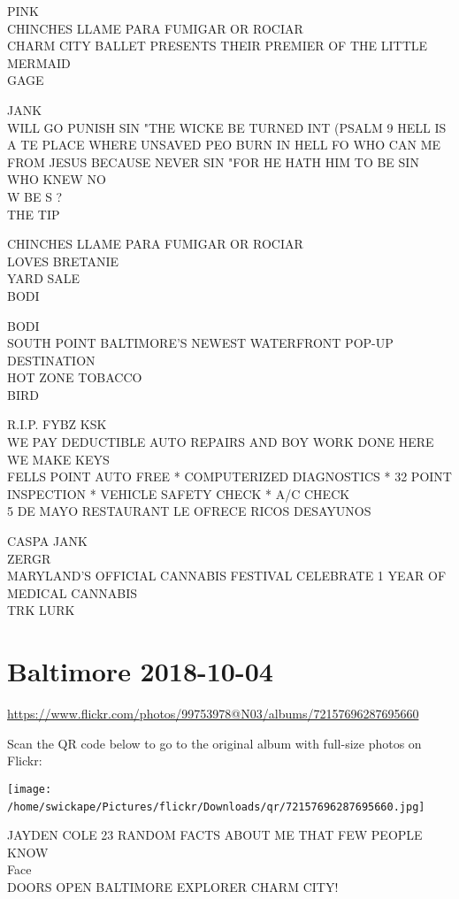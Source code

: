 \documentclass[10pt,letterpaper]{article}
\begin{document}
PINK\\
CHINCHES LLAME PARA FUMIGAR OR ROCIAR\\
CHARM CITY BALLET PRESENTS THEIR PREMIER OF THE LITTLE MERMAID\\
GAGE

JANK\\
WILL GO PUNISH SIN "THE WICKE BE TURNED INT (PSALM 9 HELL IS A TE PLACE WHERE UNSAVED PEO BURN IN HELL FO WHO CAN ME FROM JESUS BECAUSE NEVER SIN "FOR HE HATH HIM TO BE SIN WHO KNEW NO\\
W BE S ?\\
THE TIP

CHINCHES LLAME PARA FUMIGAR OR ROCIAR\\
LOVES BRETANIE\\
YARD SALE\\
BODI

BODI\\
SOUTH POINT BALTIMORE'S NEWEST WATERFRONT POP{-}UP DESTINATION\\
HOT ZONE TOBACCO\\
BIRD

R.I.P. FYBZ KSK\\
WE PAY DEDUCTIBLE AUTO REPAIRS AND BOY WORK DONE HERE WE MAKE KEYS\\
FELLS POINT AUTO FREE * COMPUTERIZED DIAGNOSTICS * 32 POINT INSPECTION * VEHICLE SAFETY CHECK * A/C CHECK\\
5 DE MAYO RESTAURANT LE OFRECE RICOS DESAYUNOS

CASPA JANK\\
ZERGR\\
MARYLAND'S OFFICIAL CANNABIS FESTIVAL CELEBRATE 1 YEAR OF MEDICAL CANNABIS\\
TRK LURK
\

\section*{Baltimore 2018-10-04}

\url{https://www.flickr.com/photos/99753978@N03/albums/72157696287695660}

Scan the QR code below to go to the original album with full-size photos on Flickr:

\texttt{[image: /home/swickape/Pictures/flickr/Downloads/qr/72157696287695660.jpg]}
\

JAYDEN COLE 23 RANDOM FACTS ABOUT ME THAT FEW PEOPLE KNOW\\
Face\\
DOORS OPEN BALTIMORE EXPLORER CHARM CITY!
\end{document}
